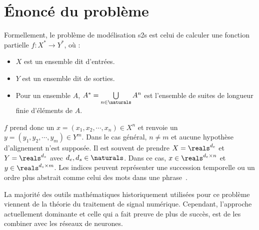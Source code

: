 \section{Énoncé du problème}

Formellement, le problème de modélisation \gls{s2s} est celui de calculer une fonction partielle
\(f: X^\ast \to Y^\ast\), où :
\begin{itemize}
    \item  \(X\) est un ensemble dit d'entrées. 
    \item \(Y\) est un ensemble dit de sorties.
    \item Pour un ensemble \(A\), \(A^\ast = \bigcup\limits_{n\in\naturals}A^n\)
    est l'ensemble de suites de longueur finie d'éléments de \(A\).
\end{itemize}
\(f\) prend donc un \(x = (x_1, x_2,\cdots, x_n)\in X^n\) 
et renvoie un \(y = (y_1, y_2,\cdots, y_m)\in Y^m\).
Dans le cas général, \(n\neq m\) et aucune hypothèse d'alignement n'est supposée.
Il est souvent de prendre \(X = \reals^{d_e}\) et \(Y = \reals^{d_s}\) avec \(d_e, d_s\in\naturals\).
Dans ce cas, 
\(x\in \reals^{d_e \times n}\) et \(y\in \reals^{d_s \times m}\).
Les indices peuvent représenter une succession temporelle 
ou un ordre plus abstrait comme celui des mots dans une phrase~\cite{Martins_2018}.

La majorité des outils mathématiques historiquement utilisées pour ce problème 
viennent de la théorie du traitement de signal numérique.
Cependant, l'approche actuellement dominante et celle qui a fait preuve de plus de succès,  
est de les combiner avec les réseaux de neurones.